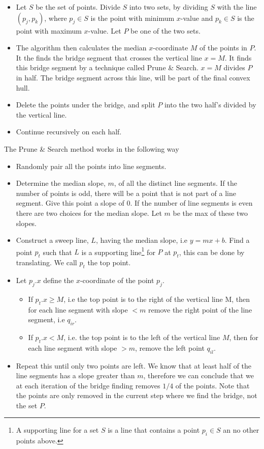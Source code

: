 \documentclass[10pt]{article}
\begin{document}
\begin{itemize}
  \item Let $S$ be the set of points. Divide $S$ into two sets, by dividing $S$ with the line $(p_j,p_k)$, where $p_j \in S$ is the point with minimum $x$-value and $p_k \in S$ is the point with maximum $x$-value. Let $P$ be one of the two sets.                                                                                                                                        
  \item The algorithm then calculates the median $x$-coordinate $M$ of the points in $P$. It the finds the bridge segment that crosses the vertical line $x=M$. It finds this bridge segment by a technique called Prune \& Search. $x=M$ divides $P$ in half. The bridge segment across this line, will be part of the final convex hull. 
  \item Delete the points under the bridge, and split $P$ into the two half's divided by the vertical line. 
  \item Continue recursively on each half.
\end{itemize}


The Prune \& Search method works in the following way

\begin{itemize}
  \item Randomly pair all the points into line segments.
  \item Determine the median slope, $m$, of all the distinct line segments. If the number of points is odd, there will be a point that is not part of a line segment. Give this point a slope of $0$. If the number of line segments is even there are two choices for the median slope. Let $m$ be the max of these two slopes.
  \item Construct a sweep line, $L$, having the median slope, i.e $y = mx+b$. Find a point $p_t$ such that $L$ is a supporting line\footnote{A supporting line for a set $S$ is a line that contains a point $p_i \in S$ an no other points above.} for $P$ at $p_t$, this can be done by translating. We call $p_t$ the top point. 
  \item Let $p_j.x$ define the $x$-coordinate of the point $p_j$. 
  \begin{itemize}
    \item If $p_t.x \geq M$, i.e the top point is to the right of the vertical line M, then for each line segment with slope $< m$ remove the right point of the line segment, i.e $q_{ir}$.
    \item If $p_t.x < M$, i.e. the top point is to the left of the vertical line $M$, then for each line segment with slope $>m$, remove the left point $q_{il}$.
  \end{itemize}
  \item Repeat this until only two points are left. We know that at least half of the line segments has a slope greater than $m$, therefore we can conclude that we at each iteration of the bridge finding removes $1/4$ of the points. Note that the points are only removed in the current step where we find the bridge, not the set $P$.
\end{itemize}
\end{document}
